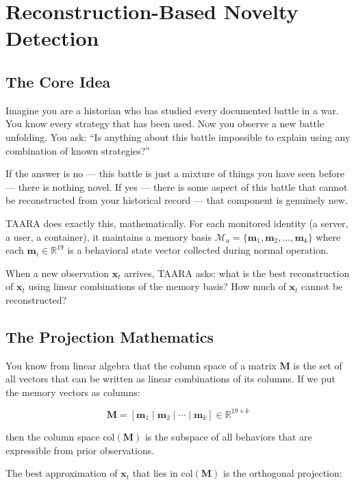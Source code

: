 \documentclass[11pt,a4paper]{article}
\newcommand{\mat}[1]{\mathbf{#1}}
\begin{document}
\section{Reconstruction-Based Novelty Detection}

\subsection{The Core Idea}

Imagine you are a historian who has studied every documented battle in a war. You know every strategy that has been used. Now you observe a new battle unfolding. You ask: ``Is anything about this battle impossible to explain using any combination of known strategies?''

If the answer is no — this battle is just a mixture of things you have seen before — there is nothing novel. If yes — there is some aspect of this battle that cannot be reconstructed from your historical record — that component is genuinely new.

TAARA does exactly this, mathematically. For each monitored identity (a server, a user, a container), it maintains a memory basis $\mathcal{M}_u = \{\mathbf{m}_1, \mathbf{m}_2, \ldots, \mathbf{m}_k\}$ where each $\mathbf{m}_i \in \mathbb{R}^{19}$ is a behavioral state vector collected during normal operation.

When a new observation $\mathbf{x}_t$ arrives, TAARA asks: what is the best reconstruction of $\mathbf{x}_t$ using linear combinations of the memory basis? How much of $\mathbf{x}_t$ cannot be reconstructed?

\subsection{The Projection Mathematics}

You know from linear algebra that the column space of a matrix $\mat{M}$ is the set of all vectors that can be written as linear combinations of its columns. If we put the memory vectors as columns:

\[
\mat{M} = [\mathbf{m}_1 \mid \mathbf{m}_2 \mid \cdots \mid \mathbf{m}_k] \in \mathbb{R}^{19 \times k}
\]

then the column space $\text{col}(\mat{M})$ is the subspace of all behaviors that are expressible from prior observations.

The best approximation of $\mathbf{x}_t$ that lies in $\text{col}(\mat{M})$ is the orthogonal projection:
\end{document}
